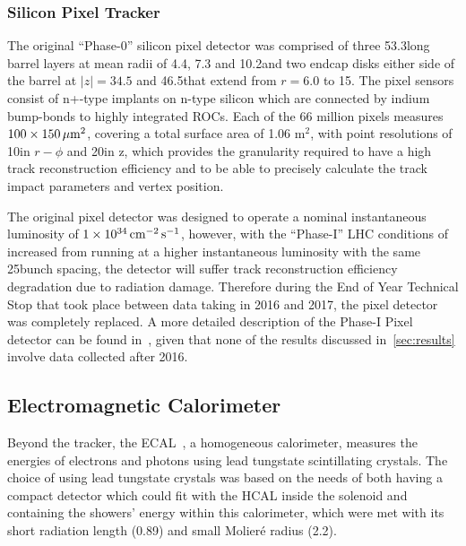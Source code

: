 \subsubsection{Silicon Pixel Tracker}
The original ``Phase-0'' silicon pixel detector was comprised of three 53.3\cm long barrel layers at mean radii of 4.4, 7.3 and 10.2\cm and two endcap disks either side of the barrel at $|z| = 34.5$ and 46.5\cm that extend from $r = 6.0$ to 15\cm.
The pixel sensors consist of n+-type implants  on n-type silicon which are connected by indium bump-bonds to highly integrated ROCs.
Each of the 66 million pixels measures $100 \times 150\,\mu\text{m}^{2}$, covering a total surface area of 1.06 m$^{2}$, with point resolutions of 10\mum in $r-\phi$ and 20\mum in z, which provides the granularity required to have a high track reconstruction efficiency and to be able to precisely calculate the track impact parameters and vertex position.

The original pixel detector was designed to operate a nominal instantaneous luminosity of $1 \times 10^{34}\,\text{cm}^\text{$-$2}\,\text{s}^\text{$-$1}$, however, with the ``Phase-I'' LHC conditions of increased \PU from running at a higher instantaneous luminosity with the same 25\ns bunch spacing, the detector will suffer track reconstruction efficiency degradation due to radiation damage.
Therefore during the End of Year Technical Stop that took place between data taking in 2016 and 2017, the pixel detector was completely replaced.
A more detailed description of the Phase-I Pixel detector can be found in~\cite{CMS:2012sda}, given that none of the results discussed in~\ref{sec:results} involve data collected after 2016.

\subsection{Electromagnetic Calorimeter}\label{subsec:ECAL}
Beyond the tracker, the ECAL~\cite{CMS:1997ysd,CMS:2002xia}, a homogeneous calorimeter, measures the energies of electrons and photons using lead tungstate scintillating crystals. 
The choice of using lead tungstate crystals was based on the needs of both having a compact detector which could fit with the HCAL inside the solenoid and containing the showers' energy within this calorimeter, which were met with its short radiation length (0.89\cm) and small Molier\'{e} radius (2.2\cm).

